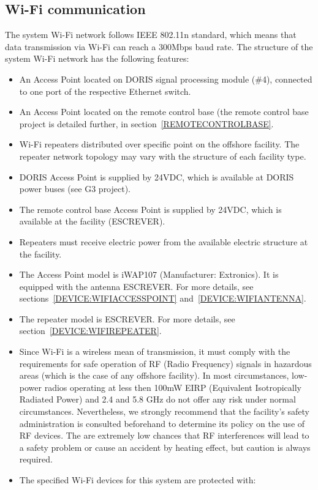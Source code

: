 \subsection{Wi-Fi communication}
The system Wi-Fi network follows IEEE 802.11n standard, which means that data transmission via Wi-Fi can reach a 300Mbps baud rate. The structure of the system Wi-Fi network has the following features:
\begin{itemize}
  \item An Access Point located on DORIS signal processing module (\#4), connected to one port of the respective Ethernet switch.
  \item An Access Point located on the remote control base (the remote control base project is detailed further, in section~\ref{REMOTECONTROLBASE}.
  \item Wi-Fi repeaters distributed over specific point on the offshore facility. The repeater network topology may vary with the structure of each facility type.
  \item DORIS Access Point is supplied by 24VDC, which is available at DORIS power buses (see G3 project).
  \item The remote control base Access Point is supplied by 24VDC, which is available at the facility (ESCREVER).
  \item Repeaters must receive electric power from the available electric structure at the facility.
  \item The Access Point model is iWAP107 (Manufacturer: Extronics). It is equipped with the antenna ESCREVER. For more details, see sections~\ref{DEVICE:WIFIACCESSPOINT} and~\ref{DEVICE:WIFIANTENNA}.
  \item The repeater model is ESCREVER. For more details, see section~\ref{DEVICE:WIFIREPEATER}.
  \item Since Wi-Fi is a wireless mean of transmission, it must comply with the requirements for safe operation of RF (Radio Frequency) signals in hazardous areas (which is the case of any offshore facility). In most circumstances, low-power radios operating at less then 100mW EIRP (Equivalent Isotropically Radiated Power) and 2.4 and 5.8 GHz do not offer any risk under normal circumstances. Nevertheless, we strongly recommend that the facility's safety administration is consulted beforehand to determine its policy on the use of RF devices. The are extremely low chances that RF interferences will lead to a safety problem or cause an accident by heating effect, but caution is always required.
  \item The specified Wi-Fi devices for this system are protected with:

\end{itemize}
